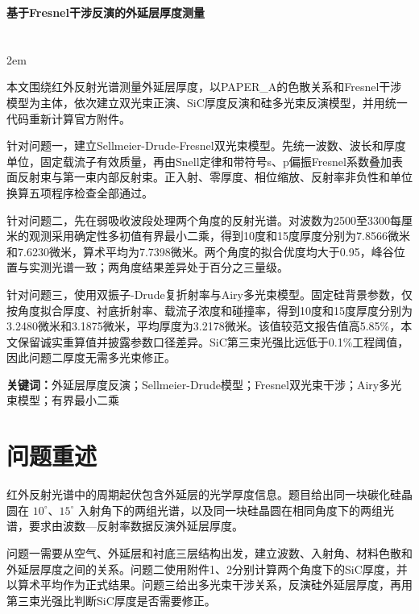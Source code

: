 \documentclass[UTF8,fontset=fandol,12pt,a4paper]{ctexart}
\makeatletter
\renewenvironment{abstract}{%
	\if@twocolumn
	\section*{\abstractname}%
	\else
	\begin{center}%
		{\bfseries\large\abstractname\vspace{0.5em}\par}%
	\end{center}%
	\fi
	\leftskip0pt\relax
	\rightskip0pt\relax
	\parindent2em\relax
	\normalsize
}{%
	\par
	\vspace{1em}
}
\makeatother
\begin{document}
	
	\begin{center}
		{\songti\bfseries{} 基于Fresnel干涉反演的外延层厚度测量}
		\vspace{0.5cm}
	\end{center}
	
	\begin{abstract}
		
		本文围绕红外反射光谱测量外延层厚度，以PAPER\_A的色散关系和Fresnel干涉模型为主体，依次建立双光束正演、SiC厚度反演和硅多光束反演模型，并用统一代码重新计算官方附件。
		
		针对问题一，建立Sellmeier-Drude-Fresnel双光束模型。先统一波数、波长和厚度单位，固定载流子有效质量，再由Snell定律和带符号s、p偏振Fresnel系数叠加表面反射束与第一束内部反射束。正入射、零厚度、相位缩放、反射率非负性和单位换算五项程序检查全部通过。
		
		针对问题二，先在弱吸收波段处理两个角度的反射光谱。对波数为2500至3300每厘米的观测采用确定性多初值有界最小二乘，得到10度和15度厚度分别为7.8566微米和7.6230微米，算术平均为7.7398微米。两个角度的拟合优度均大于0.95，峰谷位置与实测光谱一致；两角度结果差异处于百分之三量级。
		
		针对问题三，使用双振子-Drude复折射率与Airy多光束模型。固定硅背景参数，仅按角度拟合厚度、衬底折射率、载流子浓度和碰撞率，得到10度和15度厚度分别为3.2480微米和3.1875微米，平均厚度为3.2178微米。该值较范文报告值高5.85\%，本文保留诚实重算值并披露参数口径差异。SiC第三束光强比远低于0.1\%工程阈值，因此问题二厚度无需多光束修正。
		
		\vspace{0.3cm}
		\noindent
		\textbf{关键词：}外延层厚度反演；Sellmeier-Drude模型；Fresnel双光束干涉；Airy多光束模型；有界最小二乘
	\end{abstract}
	\newpage
	
	\tableofcontents
	\newpage
	
	\section{问题重述}
	
	红外反射光谱中的周期起伏包含外延层的光学厚度信息。题目给出同一块碳化硅晶圆在 $10^\circ$、$15^\circ$ 入射角下的两组光谱，以及同一块硅晶圆在相同角度下的两组光谱，要求由波数—反射率数据反演外延层厚度\cite{problem}。
	
	问题一需要从空气、外延层和衬底三层结构出发，建立波数、入射角、材料色散和外延层厚度之间的关系。问题二使用附件1、2分别计算两个角度下的SiC厚度，并以算术平均作为正式结果。问题三给出多光束干涉关系，反演硅外延层厚度，再用第三束光强比判断SiC厚度是否需要修正。
	
\end{document}
